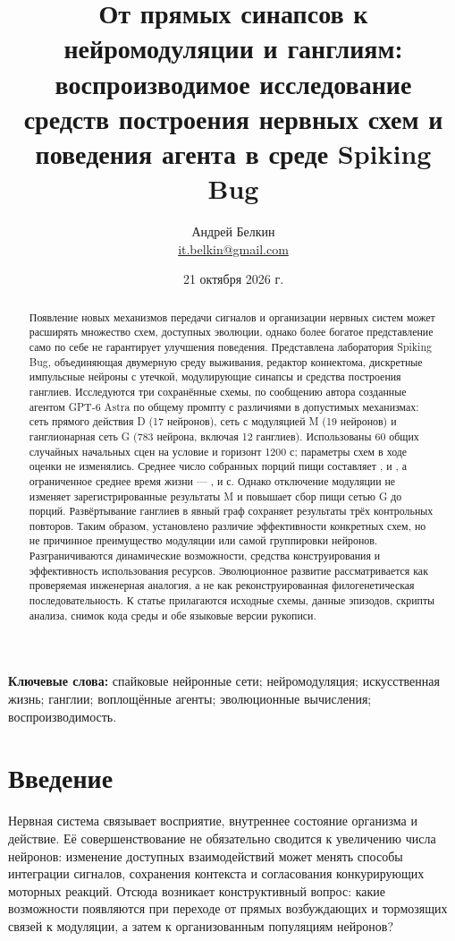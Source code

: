 \documentclass[11pt]{article}
\title{От прямых синапсов к нейромодуляции и ганглиям:\\воспроизводимое исследование средств построения нервных схем и поведения агента в среде Spiking Bug}
\author{Андрей Белкин\\\small\href{mailto:it.belkin@gmail.com}{it.belkin@gmail.com}}
\date{21 октября 2026 г.}
\begin{document}
\maketitle
\begin{abstract}
Появление новых механизмов передачи сигналов и организации нервных систем может расширять множество схем, доступных эволюции, однако более богатое представление само по себе не гарантирует улучшения поведения. Представлена лаборатория Spiking Bug, объединяющая двумерную среду выживания, редактор коннектома, дискретные импульсные нейроны с утечкой, модулирующие синапсы и средства построения ганглиев. Исследуются три сохранённые схемы, по сообщению автора созданные агентом GPT-6 Astra по общему промпту с различиями в допустимых механизмах: сеть прямого действия D (17 нейронов), сеть с модуляцией M (19 нейронов) и ганглионарная сеть G (783 нейрона, включая 12 ганглиев). Использованы 60 общих случайных начальных сцен на условие и горизонт 1200 с; параметры схем в ходе оценки не изменялись. Среднее число собранных порций пищи составляет \DFood{}, \MFood{} и \GFood{}, а ограниченное среднее время жизни --- \DTime{}, \MTime{} и \GTime{} с. Однако отключение модуляции не изменяет зарегистрированные результаты M и повышает сбор пищи сетью G до \GNoModFood{} порций. Развёртывание ганглиев в явный граф сохраняет результаты трёх контрольных повторов. Таким образом, установлено различие эффективности конкретных схем, но не причинное преимущество модуляции или самой группировки нейронов. Разграничиваются динамические возможности, средства конструирования и эффективность использования ресурсов. Эволюционное развитие рассматривается как проверяемая инженерная аналогия, а не как реконструированная филогенетическая последовательность. К статье прилагаются исходные схемы, данные эпизодов, скрипты анализа, снимок кода среды и обе языковые версии рукописи.
\end{abstract}
\noindent\textbf{Ключевые слова:} спайковые нейронные сети; нейромодуляция; искусственная жизнь; ганглии; воплощённые агенты; эволюционные вычисления; воспроизводимость.

\section{Введение}
Нервная система связывает восприятие, внутреннее состояние организма и действие. Её совершенствование не обязательно сводится к увеличению числа нейронов: изменение доступных взаимодействий может менять способы интеграции сигналов, сохранения контекста и согласования конкурирующих моторных реакций. Отсюда возникает конструктивный вопрос: какие возможности появляются при переходе от прямых возбуждающих и тормозящих связей к модуляции, а затем к организованным популяциям нейронов?
\end{document}
